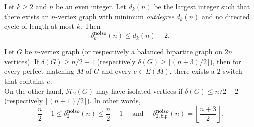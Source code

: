 \documentclass[10pt,a4paper]{amsart}
\begin{document}
\begin{theorem}\label{thm:isolated_Caccetta}
  Let $k \ge 2$ and $n$ be an even integer. Let $d_k(n)$ be the largest integer such
  that there exists an $n$-vertex graph with minimum \emph{outdegree} $d_k(n)$ and no
  directed cycle of length at most $k$. Then
  $$\delta^{\mathbf{no iso}}_k(n) \le d_k(n)+2.$$
\end{theorem}

\begin{theorem}\label{thm:isolated_k=2}
  Let $G$ be $n$-vertex graph (or respectively a balanced bipartite graph on
  $2n$ vertices). If $\delta(G) \ge n/2+1$ (respectively
  $\delta(G) \ge \lfloor (n+3)/2\rfloor$), then for every perfect matching $M$
  of $G$ and every $e \in E(M)$, there exists a $2$-switch that contains $e$.\\
  On the other hand, $\mathcal H_2(G)$ may have isolated vertices if
  $\delta(G) \le n/2 -2$ (respectively $ \lfloor (n+1)/2\rfloor$). In other words,
  $$ \frac{n}2-1 \le \delta^{\mathbf{no iso}}_2(n) \le \frac{n}2+1  \quad \text{ and } \quad
  \delta^{\mathbf{no iso}}_{2,\mathrm{bip}}(n) = \left\lfloor \frac{n+3}2 \right\rfloor.$$
\end{theorem}
\end{document}
